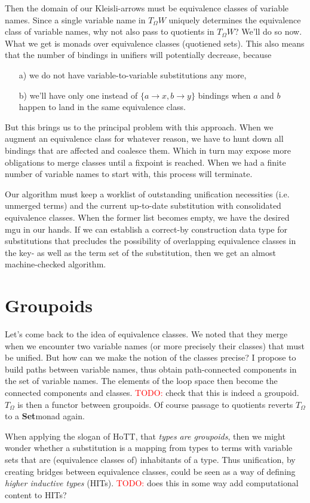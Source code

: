 \documentclass{article}
\newcommand \todo[1] {\textcolor{red}{TODO: }#1}
\newcommand \catname[1] {{\normalfont\textbf{#1}}}
\newcommand \Set {\catname {Set}}
\begin{document}
Then the domain of our Kleisli-arrows must be equivalence classes of variable names. Since a single variable name in $T_{\Omega}W$ uniquely determines the equivalence class of variable names, why not also pass to quotients in $T_{\Omega}W$?
We'll do so now. What we get is monads over equivalence classes (quotiened sets). This also means that the number of bindings in unifiers will potentially decrease, because
\begin{itemize}
\item[a)] we do not have variable-to-variable substitutions any more,
\item[b)] we'll have only one instead of $\{a \to x, b \to y\}$ bindings when $a$ and $b$ happen to land in the same equivalence class.
\end{itemize}
But this brings us to the principal problem with this approach. When we augment an equivalence class for whatever reason, we have to hunt down all bindings that are affected and coalesce them. Which in turn may expose more obligations to merge classes until a fixpoint is reached. When we had a finite number of variable names to start with, this process will terminate.
\par Our algorithm must keep a worklist of outstanding unification necessities (i.e. unmerged terms) and the current up-to-date substitution with consolidated equivalence classes.
When the former list becomes empty, we have the desired mgu in our hands.
If we can establish a correct-by construction data type for substitutions that precludes the possibility of overlapping equivalence classes in the key- as well as the term set of the substitution, then we get an almost machine-checked algorithm.

\section {Groupoids}
Let's come back to the idea of equivalence classes. We noted that they merge when we encounter two variable names (or more precisely their classes) that must be unified. But how can we make the notion of the classes precise? I propose to build paths between variable names, thus obtain path-connected components in the set of variable names. The elements of the loop space then become the connected components and classes. \todo {check that this is indeed a groupoid.} $T_{\Omega}$ is then a functor between groupoids. Of course passage to quotients reverts $T_{\Omega}$ to a \Set monad again.
\par When applying the slogan of HoTT, that \emph {types are groupoids}, then we might wonder whether a substitution is a mapping from types to terms with variable sets that are (equivalence classes of) inhabitants of a type. Thus unification, by creating bridges between equivalence classes, could be seen as a way of defining \emph {higher inductive types} (HITs). \todo {does this in some way add computational content to HITs?}
\end{document}
